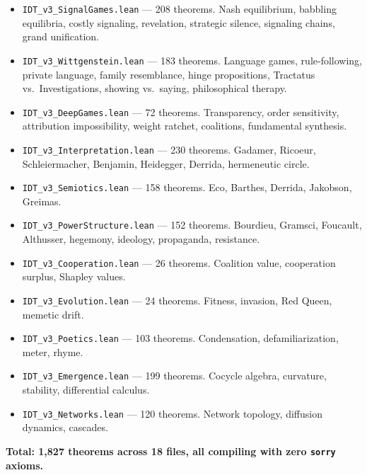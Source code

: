 \documentclass[11pt,oneside]{book}
\theoremstyle{plain}
\theoremstyle{definition}
\theoremstyle{remark}
\begin{document}
\begin{itemize}
\item \texttt{IDT\_v3\_SignalGames.lean} --- 208 theorems. Nash equilibrium,
babbling equilibria, costly signaling, revelation, strategic silence,
signaling chains, grand unification.

\item \texttt{IDT\_v3\_Wittgenstein.lean} --- 183 theorems. Language games,
rule-following, private language, family resemblance, hinge propositions,
Tractatus vs.\ Investigations, showing vs.\ saying, philosophical therapy.

\item \texttt{IDT\_v3\_DeepGames.lean} --- 72 theorems. Transparency,
order sensitivity, attribution impossibility, weight ratchet, coalitions,
fundamental synthesis.

\item \texttt{IDT\_v3\_Interpretation.lean} --- 230 theorems. Gadamer,
Ricoeur, Schleiermacher, Benjamin, Heidegger, Derrida, hermeneutic circle.

\item \texttt{IDT\_v3\_Semiotics.lean} --- 158 theorems. Eco, Barthes,
Derrida, Jakobson, Greimas.

\item \texttt{IDT\_v3\_PowerStructure.lean} --- 152 theorems. Bourdieu,
Gramsci, Foucault, Althusser, hegemony, ideology, propaganda, resistance.

\item \texttt{IDT\_v3\_Cooperation.lean} --- 26 theorems. Coalition value,
cooperation surplus, Shapley values.

\item \texttt{IDT\_v3\_Evolution.lean} --- 24 theorems. Fitness, invasion,
Red Queen, memetic drift.

\item \texttt{IDT\_v3\_Poetics.lean} --- 103 theorems. Condensation,
defamiliarization, meter, rhyme.

\item \texttt{IDT\_v3\_Emergence.lean} --- 199 theorems. Cocycle algebra,
curvature, stability, differential calculus.

\item \texttt{IDT\_v3\_Networks.lean} --- 120 theorems. Network topology,
diffusion dynamics, cascades.
\end{itemize}

\noindent\textbf{Total: 1,827 theorems across 18 files, all compiling with zero
\texttt{sorry} axioms.}
\end{document}
